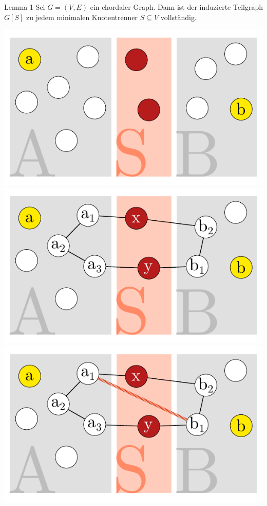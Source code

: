\documentclass[xcolor=x11names,compress]{beamer}
\begin{document}
\begin{frame}
	\begin{block}{Lemma 1}
		Sei \( G = \left( V, E \right) \) ein chordaler Graph. Dann ist der induzierte Teilgraph \( G \left[ S \right] \) zu jedem minimalen Knotentrenner \( S \subseteq V \) vollständig.
	\end{block}
	\begin{center}
		\begin{overprint}
			\includegraphics[scale=1.0]{img/graph/nodeseparator/proof/01.pdf}
			\onslide<3>\includegraphics[scale=1.0]{img/graph/nodeseparator/proof/02.pdf}
			\onslide<4>\includegraphics[scale=1.0]{img/graph/nodeseparator/proof/03.pdf}

\end{overprint}
\end{center}
\end{frame}
\end{document}
